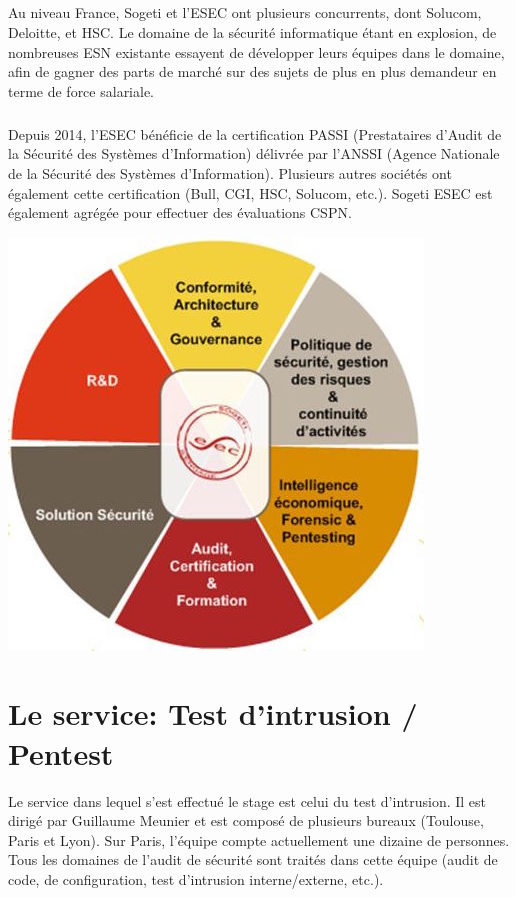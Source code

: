 \subparagraph{}
Au niveau France, Sogeti et l'ESEC ont plusieurs concurrents, dont Solucom, Deloitte,
et HSC. Le domaine de la sécurité informatique étant en explosion, de nombreuses ESN existante
essayent de développer leurs équipes dans le domaine, afin de gagner des parts de marché
sur des sujets de plus en plus demandeur en terme de force salariale.

\subparagraph{}
Depuis 2014, l'ESEC bénéficie de la certification PASSI (Prestataires d'Audit de la Sécurité
des Systèmes d'Information) délivrée par l'ANSSI (Agence Nationale de la Sécurité des Systèmes
d'Information). Plusieurs autres sociétés ont également cette certification (Bull, CGI, HSC, Solucom, etc.).
Sogeti ESEC est également agrégée pour effectuer des évaluations CSPN.

\begin{center}
\includegraphics[scale=0.5]{activities.jpg}
\end{center}

\section*{Le service: Test d'intrusion / Pentest}
Le service dans lequel s'est effectué le stage est celui du test d'intrusion. Il est dirigé par Guillaume Meunier et est composé
de plusieurs bureaux (Toulouse, Paris et Lyon). Sur Paris, l'équipe compte actuellement une dizaine de personnes. Tous les domaines de l'audit de
sécurité sont traités dans cette équipe (audit de code, de configuration, test d'intrusion interne/externe, etc.).

